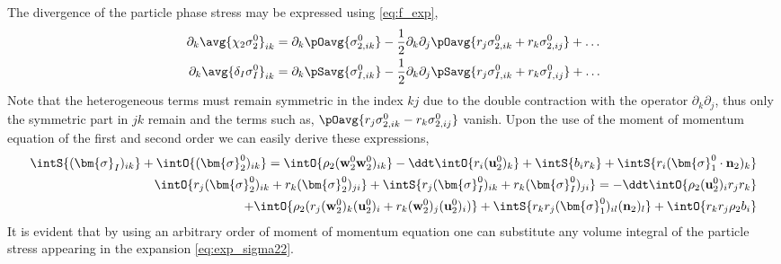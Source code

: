 The divergence of the particle phase stress may be expressed using \ref{eq:f_exp}, 
\begin{align}
    \label{eq:exp_sigma22}
    \partial_k \avg{\chi_2 {\sigma}_2^0}_{ik}
    &=  \partial_k\pOavg{ {\sigma}_{2,ik}^0}
    -\frac{1}{2} \partial_k\partial_j
    \pOavg{ r_j{\sigma}^0_{2,ik} + r_k\sigma^0_{2,ij}}
    + \ldots  \\
    \label{eq:exp_sigmaI2}
    \partial_k \avg{\delta_I {\sigma}^0_I}_{ik} 
    &=  \partial_k\pSavg{ {\sigma}_{I,ik}^0 }
        -\frac{1}{2} \partial_k\partial_j \pSavg{ r_j {\sigma}_{I,ik}^0+r_k {\sigma}_{I,ij}^0 }
        + \ldots  
\end{align}
Note that the heterogeneous terms must remain symmetric in the index $kj$ due to the double contraction with the operator $\partial_k\partial_j$, thus only the symmetric part in $jk$ remain and the terms such as, $\pOavg{ r_j{\sigma}^0_{2,ik} - r_k\sigma^0_{2,ij}}$ vanish. 
Upon the use of the moment of momentum equation of the first and second order we can easily derive these expressions, 
\begin{align}
    \intS{ (\bm{\sigma}_I)_{ik}}
    +\intO{ (\bm{\sigma}_2^0)_{ik}}
    = 
    \intO{ \rho_2 
    (\textbf{w}_2^0\textbf{w}_2^0  )_{ik}
    }
    -\ddt \intO{ r_i (\textbf{u}^0_2)_k }
    +\intS{ 
        b_{i}
        r_k 
    }
    +\intS{ 
     r_i (\bm{\sigma}_1^0 \cdot \textbf{n}_2)_{k}
    }
    \label{eq:dt_P_alpha}\\
    \intO{ r_{j}(\bm{\sigma}^0_2)_{ik}+r_{k}(\bm{\sigma}^0_2)_{ji}}
    +\intS{ r_{j}(\bm{\sigma}^0_I)_{ik}+r_{k}(\bm{\sigma}_I^0)_{ji}}
    = 
    - \ddt\intO{ \rho_2 (\textbf{u}_2^0)_i r_j r_k }\nonumber\\
    + \intO{ \rho_2 (r_{j} (\textbf{w}_2^0)_k (\textbf{u}^0_2)_i + r_k (\textbf{w}_2^0)_j (\textbf{u}^0_2)_i)}
    +\intS{  r_{k}r_{j} (\bm{\sigma}_1^0)_{il} (\textbf{n}_2)_l }
    + \intO{ r_{k}r_{j}  \rho_2 b_i } 
    \label{eq:dt_P2_alpha}
\end{align}
It is evident that by using an arbitrary order of moment of momentum equation one can substitute any volume integral of the particle stress appearing in the expansion \ref{eq:exp_sigma22}. 
